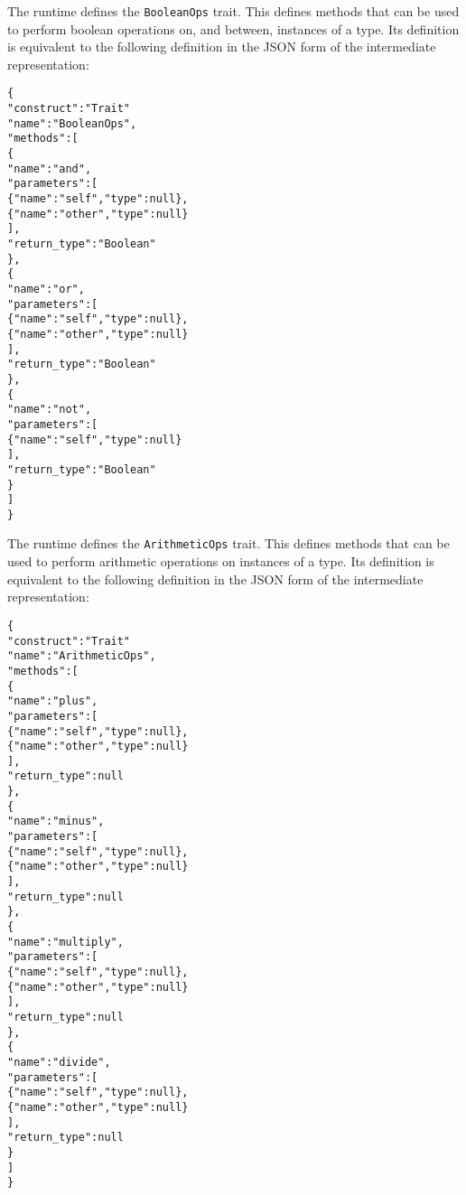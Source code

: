 \documentclass[10pt,twocolumn,a4paper]{article}
\newcommand{\code}[1]{\texttt{#1}}
\begin{document}
The runtime defines the \code{BooleanOps} trait. This defines methods
that can be used to perform boolean operations on, and between, instances
of a type.
Its definition is equivalent to the following definition in the JSON
form of the intermediate representation:
\footnotesize
\begin{alltt}
  \{
    "construct" : "Trait"
    "name"      : "BooleanOps",
    "methods"   : [
      \{
        "name"        : "and",
        "parameters"  : [
          \{"name" : "self",  "type"   : null\},
          \{"name" : "other", "type"   : null\}
        ],
        "return\_type" : "Boolean"
      \},
      \{
        "name"        : "or",
        "parameters"  : [
          \{"name" : "self",  "type"   : null\},
          \{"name" : "other", "type"   : null\}
        ],
        "return\_type" : "Boolean"
      \},
      \{
        "name"        : "not",
        "parameters"  : [
          \{"name" : "self",  "type"   : null\}
        ],
        "return\_type" : "Boolean"
      \}
    ]
  \}
\end{alltt}
\normalsize

The runtime defines the \code{ArithmeticOps} trait. This defines methods
that can be used to perform arithmetic operations on instances of a type.
Its definition is equivalent to the following definition in the JSON
form of the intermediate representation:
\footnotesize
\begin{alltt}
  \{
    "construct" : "Trait"
    "name"      : "ArithmeticOps",
    "methods"   : [
      \{
        "name"        : "plus",
        "parameters"  : [
          \{"name" : "self",  "type"   : null\},
          \{"name" : "other", "type"   : null\}
        ],
        "return\_type" : null
      \},
      \{
        "name"        : "minus",
        "parameters"  : [
          \{"name" : "self",  "type"   : null\},
          \{"name" : "other", "type"   : null\}
        ],
        "return\_type" : null
      \},
      \{
        "name"        : "multiply",
        "parameters"  : [
          \{"name" : "self",  "type"   : null\},
          \{"name" : "other", "type"   : null\}
        ],
        "return\_type" : null
      \},
      \{
        "name"        : "divide",
        "parameters"  : [
          \{"name" : "self",  "type"   : null\},
          \{"name" : "other", "type"   : null\}
        ],
        "return\_type" : null
      \}
    ]
  \}
\end{alltt}
\normalsize

\end{document}
